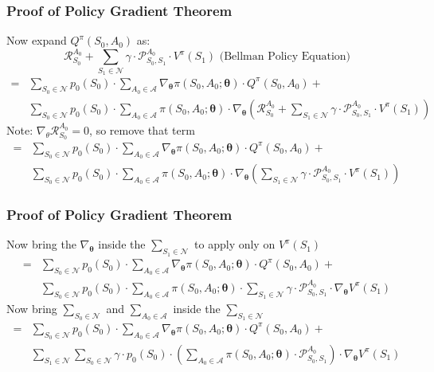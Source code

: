 \documentclass[handout]{beamer}
\begin{document}
\begin{frame}
\frametitle{Proof of Policy Gradient Theorem}
\pause
Now expand $Q^{\pi}(S_0, A_0)$ as:
$$\mathcal{R}_{S_0}^{A_0} + \sum_{S_1 \in \mathcal{N}} \gamma \cdot \mathcal{P}_{S_0, S_1}^{A_0} \cdot V^{\pi}(S_1) \mbox{ (Bellman Policy Equation)}$$
\pause
\begin{align*} 
= & \sum_{S_0 \in \mathcal{N}} p_0(S_0) \cdot \sum_{A_0 \in \mathcal{A}} \nabla_{\bm{\theta}} \pi(S_0, A_0; \bm{\theta}) \cdot Q^{\pi}(S_0, A_0) + \\
& \sum_{S_0 \in \mathcal{N}} p_0(S_0) \cdot \sum_{A_0 \in \mathcal{A}} \pi(S_0, A_0; \bm{\theta}) \cdot \nabla_{\bm{\theta}} (\mathcal{R}_{S_0}^{A_0} + \sum_{S_1 \in \mathcal{N}} \gamma \cdot  \mathcal{P}_{S_0,S_1}^{A_0} \cdot V^{\pi}(S_1))
\end{align*}
\pause
Note: $\nabla_{\theta} \mathcal{R}_{S_0}^{A_0} = 0$, so remove that term
\pause
\begin{align*}
= & \sum_{S_0 \in \mathcal{N}} p_0(S_0) \cdot \sum_{A_0 \in \mathcal{A}} \nabla_{\bm{\theta}} \pi(S_0, A_0; \bm{\theta}) \cdot Q^{\pi}(S_0, A_0) + \\
& \sum_{S_0 \in \mathcal{N}} p_0(S_0) \cdot \sum_{A_0 \in \mathcal{A}} \pi(S_0, A_0; \bm{\theta}) \cdot \nabla_{\bm{\theta}} (\sum_{S_1 \in \mathcal{N}} \gamma \cdot \mathcal{P}_{S_0,S_1}^{A_0} \cdot V^{\pi}(S_1))
\end{align*}
\end{frame}

\begin{frame}
\frametitle{Proof of Policy Gradient Theorem}
\pause
Now bring the $\nabla_{\bm{\theta}}$ inside the $\sum_{S_1 \in \mathcal{N}}$ to apply only on $V^{\pi}(S_1)$
\pause
\begin{align*}
= & \sum_{S_0 \in \mathcal{N}} p_0(S_0) \cdot \sum_{A_0 \in \mathcal{A}} \nabla_{\bm{\theta}} \pi(S_0, A_0; \bm{\theta}) \cdot Q^{\pi}(S_0, A_0) + \\
& \sum_{S_0 \in \mathcal{N}} p_0(S_0) \cdot \sum_{A_0 \in \mathcal{A}} \pi(S_0, A_0; \bm{\theta}) \cdot \sum_{S_1 \in \mathcal{N}} \gamma \cdot \mathcal{P}_{S_0,S_1}^{A_0} \cdot \nabla_{\bm{\theta}} V^{\pi}(S_1)
\end{align*}
\pause
Now bring $\sum_{S_0 \in \mathcal{N}}$ and $\sum_{A_0 \in \mathcal{A}}$ inside the $\sum_{S_1 \in \mathcal{N}}$
\pause
\begin{align*}
= & \sum_{S_0 \in \mathcal{N}} p_0(S_0) \cdot \sum_{A_0 \in \mathcal{A}} \nabla_{\bm{\theta}} \pi(S_0, A_0; \bm{\theta}) \cdot Q^{\pi}(S_0, A_0) + \\
& \sum_{S_1 \in \mathcal{N}}  \sum_{S_0 \in \mathcal{N}} \gamma \cdot p_0(S_0) \cdot (\sum_{A_0 \in \mathcal{A}} \pi(S_0, A_0; \bm{\theta}) \cdot \mathcal{P}_{S_0,S_1}^{A_0}) \cdot \nabla_{\bm{\theta}}V^{\pi}(S_1)
\end{align*}
\end{frame}
\end{document}
